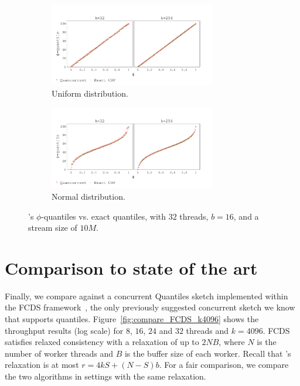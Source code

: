 \begin{figure}[h!]
\centering
    \begin{subfigure}[]{\textwidth}
        \centering
        \includegraphics[width=0.8\textwidth,trim={0.1cm 0.2cm 1.5cm 1cm},clip]
        {graphics/graphs/accuracy/Oracle_Quancurrent_blocking_numa_cdf_uniform_ks_32_256_b16_keys10M_runs1_uT_32_qT1_snapshot1_17-09-2022_06-51-43.pdf}
        \caption{Uniform distribution.} \label{fig:cdf_uniform}
    \end{subfigure}
    
    \begin{subfigure}[]{\textwidth}
        \centering
        \includegraphics[width=0.8\textwidth,trim={0.1cm 0.2cm 1.5cm 1cm},clip]
        {graphics/graphs/accuracy/Oracle_Quancurrent_blocking_numa_cdf_normal_ks_32_256_b16_keys10M_runs1_uT_32_qT1_snapshot1_17-09-2022_06-51-43.pdf}
        \caption{Normal distribution.} \label{fig:cdf_normal}
    \end{subfigure}

\caption{\mysketch's $\phi$-quantiles vs. exact quantiles, with $32$ threads, $b=16$, and a stream size of $10M$.} \label{fig:cdf}
\end{figure}

\section{Comparison to state of the art}
\label{sec:compare} 
Finally, we compare \mysketch against a concurrent Quantiles sketch implemented within the FCDS framework~\cite{Rinberg_2020_fast_sketches}, the only previously suggested concurrent sketch we know that supports quantiles. Figure~\ref{fig:compare_FCDS_k4096} shows the throughput results (log scale) for $8$, $16$, $24$ and $32$ threads and $k=4096$.
FCDS satisfies relaxed consistency with a relaxation of up to $2NB$, where $N$ is the number of worker threads and $B$ is the buffer size of each worker. Recall that \mysketch's relaxation is at most $r = 4kS+(N-S)b$. For a fair comparison, we compare the two algorithms in settings with the same relaxation.

